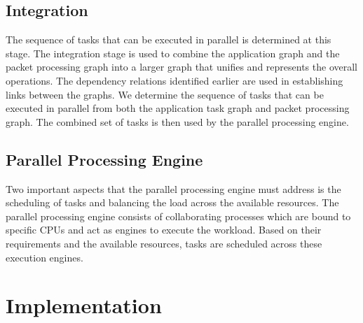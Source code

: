 \documentclass[conference]{IEEEtran}
\newcommand{\comment}[1]{}
\begin{document}
\subsection{Integration}

The sequence of tasks that can be executed in parallel is determined at this stage. The integration stage is used to combine the application graph and the packet processing graph into a larger graph that unifies and represents the overall operations. The dependency relations identified earlier are used in establishing links between the graphs. We determine the sequence of tasks that can be executed in parallel from both the application task graph and packet processing graph. The combined set of tasks is then used by the parallel processing engine.

\subsection{Parallel Processing Engine}

Two important aspects that the parallel processing engine must address is the scheduling of tasks and balancing the load across the available resources. The parallel processing engine consists of collaborating processes which are bound to specific CPUs and act as engines to execute the workload. Based on their requirements and the available resources, tasks are scheduled across these execution engines. \comment{In this manner, the workload can be distributed flexibly.}

\section{Implementation}
\label{imple}
\end{document}
